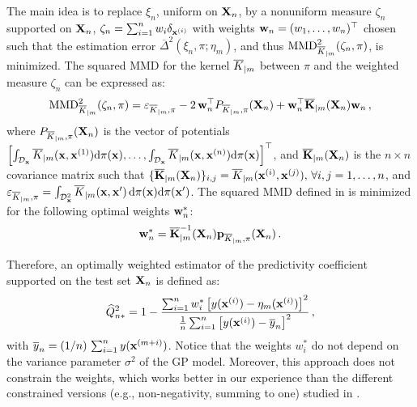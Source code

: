 The main idea is to replace $\xi_n$, uniform on ${\bf X}_n$, by a nonuniform measure $\zeta_n$ supported on ${\bf X}_n$, $\zeta_n = \sum_{i=1}^n w_i \delta_{{\bf x}^{(i)}}$ with weights $\mathbf{w}_n = (w_1,\ldots,w_n)^\top$ chosen such that the estimation error $\overline{\Delta}^2(\xi_n,\pi;\eta_m)$, and thus $\mathrm{MMD}_{\overline{K}_{|m}}^2(\zeta_n,\pi)$, is minimized. 
The squared MMD for the kernel $\overline{K}_{|m}$ between $\pi$ and the weighted measure $\zeta_n$ can be expressed as:  
\begin{equation}
    \mathrm{MMD}_{\overline{K}_{|m}}^2(\zeta_n,\pi) = \varepsilon_{\overline{K}_{|m}, \pi} - 2\,\mathbf{w}_n^\top P_{\overline{K}_{|m}, \pi}({\bf X}_n) + \mathbf{w}_n^\top\overline{\mathbf{K}}_{|m}({\bf X}_n)\mathbf{w}_n \,,
    \label{eq:mmd2_validation}
\end{equation}
where $P_{\overline{K}_{|m}, \pi}({\bf X}_n)$ is the vector of potentials $\left[\int_{\mathcal{D}_{\bf x}} \overline{K}_{|m}({\bf x}, {\bf x}^{(1)}) \mathrm{d} \pi({\bf x}), \dots, \int_{\mathcal{D}_{\bf x}} \overline{K}_{|m}({\bf x}, {\bf x}^{(n)}) \mathrm{d} \pi({\bf x})\right]^\top$, 
and $\overline{\mathbf{K}}_{|m}({\bf X}_n)$ is the $n \times n$ covariance matrix such that $\{\overline{\mathbf{K}}_{|m}({\bf X}_n)\}_{i,j}=\overline{K}_{|m}({\bf x}^{(i)},{\bf x}^{(j)}), \, \forall i,j=1,\ldots,n$, 
and $\varepsilon_{\overline{K}_{|m}, \pi}=\int_{\mathcal{D}_{\bf x}^2} \overline{K}_{|m}({\bf x},{\bf x}')\,\mathrm{d}\pi({\bf x})\mathrm{d}\pi({\bf x}')$.
%
The squared MMD defined in  is minimized for the following optimal weights $\mathbf{w}_n^*$: 
\begin{equation}
    \label{Eq:weights}
    \mathbf{w}_n^* = \overline{\mathbf{K}}_{|m}^{-1}({\bf X}_n)\mathbf{p}_{\overline{K}_{|m}, \pi}({\bf X}_n) \,.
\end{equation}

Therefore, an optimally weighted estimator of the predictivity coefficient supported on the test set ${\bf X}_n$ is defined as: 
\begin{equation}
    \widehat Q_{n*}^2 = 1 - \frac{\sum_{i=1}^n w_i^* \left[ y({\bf x}^{(i)})-\eta_m({\bf x}^{(i)})\right]^2}{\frac1n \sum_{i=1}^n \left[y({\bf x}^{(i)})-\overline{y}_n\right]^2} \,,
    \label{Q2-est*}
\end{equation}
with $\overline{y}_n=(1/n)\,\sum_{i=1}^n y({\bf x}^{(m+i)})$.
Notice that the weights $w_i^*$ do not depend on the variance parameter $\sigma^2$ of the GP model. 
Moreover, this approach does not constrain the weights, which works better in our experience than the different constrained versions (e.g., non-negativity, summing to one) studied in \citet{PR2021a}. 

